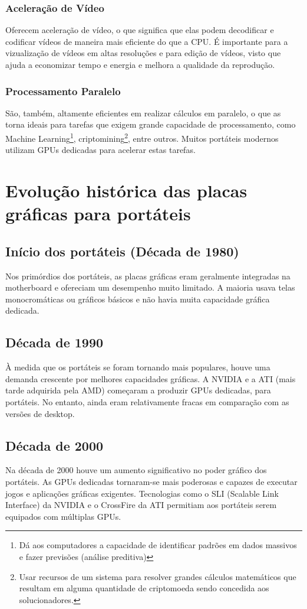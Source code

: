 \documentclass[a4paper,11pt,]{report}
\begin{document}
\subsubsection{Aceleração de Vídeo}
Oferecem aceleração de vídeo, o que significa que elas podem decodificar e codificar vídeos de maneira mais eficiente do que a CPU. É importante para a vizualização de vídeos em altas resoluções e para edição de vídeos, visto que ajuda a economizar tempo e energia e melhora a qualidade da reprodução.
\subsubsection{Processamento Paralelo}
São, também, altamente eficientes em realizar cálculos em paralelo, o que as torna ideais para tarefas que exigem grande capacidade de processamento, como Machine Learning\footnote{Dá aos computadores a capacidade de identificar padrões em dados massivos e fazer previsões (análise preditiva)}, criptomining\footnote{Usar recursos de um sistema para resolver grandes cálculos matemáticos que resultam em alguma quantidade de criptomoeda sendo concedida aos solucionadores.}, entre outros. Muitos portáteis modernos utilizam GPUs dedicadas para acelerar estas tarefas.

\section{Evolução histórica das placas gráficas para portáteis}
\subsection{Início dos portáteis (Década de 1980)}
Nos primórdios dos portáteis, as placas gráficas eram geralmente integradas na motherboard e ofereciam um desempenho muito limitado. A maioria usava telas monocromáticas ou gráficos básicos e não havia muita capacidade gráfica dedicada.
\subsection{Década de 1990}
À medida que os portáteis se foram tornando mais populares, houve uma demanda crescente por melhores capacidades gráficas. A NVIDIA e a ATI (mais tarde adquirida pela AMD) começaram a produzir GPUs dedicadas, para portáteis. No entanto, ainda eram relativamente fracas em comparação com as versões de desktop.
\subsection{Década de 2000}
Na década de 2000 houve um aumento significativo no poder gráfico dos portáteis. As GPUs dedicadas tornaram-se mais poderosas e capazes de executar jogos e aplicações gráficas exigentes. Tecnologias como o SLI (Scalable Link Interface) da NVIDIA e o CrossFire da ATI permitiam aos portáteis serem equipados com múltiplas GPUs.
\end{document}
